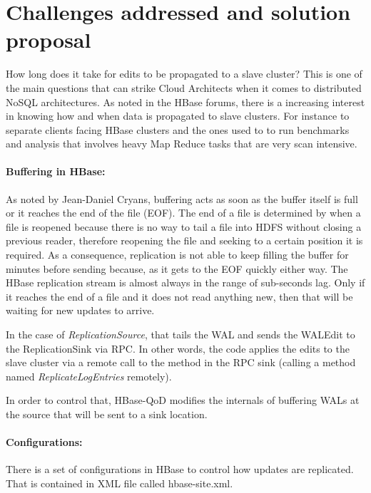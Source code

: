 \section{Challenges addressed and solution proposal}
How long does it take for edits to be propagated to a slave cluster? This is one of the main questions that can strike Cloud Architects when it comes to distributed NoSQL architectures. As noted in the HBase forums, there is a increasing interest in knowing how and when data is propagated to slave clusters. For instance to separate clients facing HBase clusters and the ones used to to run benchmarks and analysis that involves heavy Map Reduce tasks that are very scan intensive.

\paragraph{Buffering in HBase:}
As noted by Jean-Daniel Cryans, buffering acts as soon as the buffer itself is full or it reaches the end of the file (EOF). The end of a file is determined by when a file is reopened because there is no way to tail a file into HDFS without closing a previous reader, therefore reopening the file and seeking to a certain position it is required. As a consequence, replication is not able to keep filling the buffer for minutes before sending because, as it gets to the EOF quickly either way. The HBase replication stream is almost always in the range of sub-seconds lag. Only if it reaches the end of a file and it does not read anything new, then that will be waiting for new updates to arrive.

In the case of \emph{ReplicationSource}, that tails the WAL and sends the WALEdit to the ReplicationSink via RPC. In other words, the code applies the edits to the slave cluster via a remote call to the method in the RPC sink (calling a method named \emph{ReplicateLogEntries} remotely).

In order to control that, HBase-QoD modifies the internals of buffering WALs at the source that will be sent to a sink location.

\paragraph{Configurations:}
There is a set of configurations in HBase to control how updates are replicated. That is contained in XML file called hbase-site.xml.

